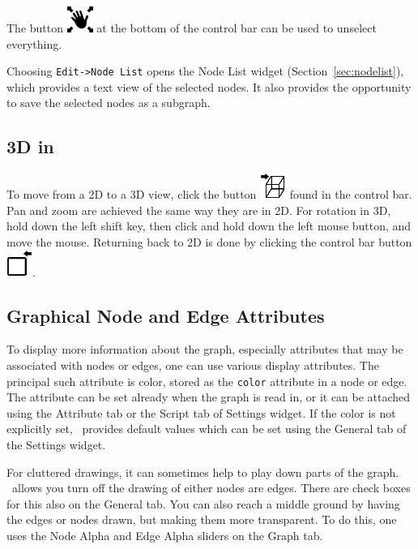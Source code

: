 The button
\includegraphics{figures/pan.png}
at the bottom of the control bar can be used to unselect everything.

Choosing {\tt Edit->Node List} opens the Node List widget (Section~\ref{sec:nodelist}),
which provides a text view of the selected nodes. It also provides the opportunity
to save the selected nodes as a subgraph.

\subsection{3D in \smyrna}
\label{sec:3D}
To move from a 2D to a 3D view, click the button \includegraphics{figures/3D.png}
found in the control bar. Pan and zoom are achieved the same way they are in 2D.
For rotation in 3D, hold down the left shift key, then click and hold 
down the left mouse button, and move the mouse.
Returning back to 2D is done by clicking the control bar button
\includegraphics{figures/2D.png}.

\subsection{Graphical Node and Edge Attributes}
To display more information about the graph, especially attributes
that may be associated with nodes or edges, one can use various
display attributes. The principal such attribute is color, stored
as the {\tt color} attribute in a node or edge. The attribute can
be set already when the graph is read in, or it can be attached
using the Attribute tab or the Script tab of Settings widget.
If the color is not explicitly set, \smyrna\ provides default values
which can be set using the General tab of the Settings widget.

For cluttered drawings, it can sometimes help to play down parts of the graph.
\smyrna\ allows you turn off the drawing of either nodes are edges. There 
are check boxes for this also on the General tab.
You can also reach a middle ground by having the edges or nodes drawn, but making
them more transparent. To do this, one uses the Node Alpha and Edge Alpha sliders
on the Graph tab.

